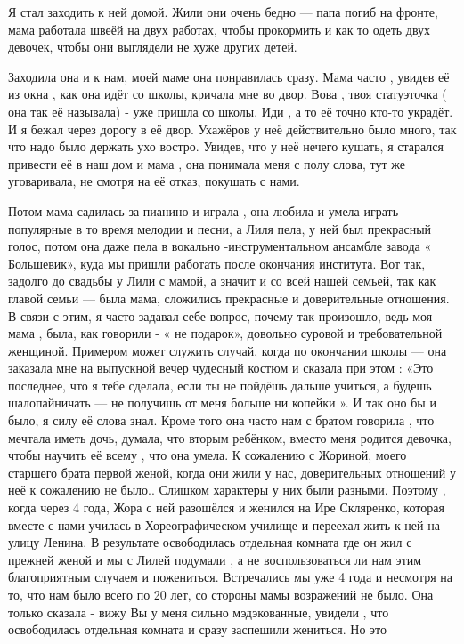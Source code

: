 Я стал заходить к ней домой. Жили они очень бедно — папа погиб на фронте, мама
работала швеёй на двух работах, чтобы прокормить и как то одеть двух девочек,
чтобы они  выглядели не хуже других детей.

Заходила она и к нам, моей маме она понравилась сразу. Мама часто , увидев её
из окна , как она идёт со школы, кричала мне во двор. Вова , твоя статуэточка (
она так её называла) - уже пришла со школы. Иди , а то её точно кто-то украдёт.
И я бежал через дорогу в её двор.  Ухажёров у неё действительно было много, так
что надо было держать ухо востро. Увидев, что у неё нечего  кушать, я старался
привести её в наш дом и мама , она понимала меня с полу слова, тут же
уговаривала, не смотря на её отказ, покушать с нами.

Потом мама садилась за пианино и играла , она любила и умела играть популярные
в то время мелодии и песни, а Лиля пела, у ней был прекрасный голос, потом она
даже пела в вокально -инструментальном ансамбле завода « Большевик», куда мы
пришли работать после окончания института. Вот так, задолго до свадьбы у Лили с
мамой, а значит и со всей нашей семьей, так как главой семьи — была мама,
сложились прекрасные и доверительные отношения.  В связи с этим, я часто
задавал  себе вопрос, почему так произошло, ведь моя мама ,  была, как говорили
- « не подарок»,  довольно суровой и требовательной женщиной. Примером может
служить случай, когда по окончании школы — она заказала мне на выпускной  вечер
чудесный костюм и сказала при этом : «Это последнее, что я тебе сделала, если
ты не пойдёшь дальше учиться, а будешь шалопайничать — не получишь от меня
больше ни копейки ». И так оно бы и было, я силу её слова знал.  Кроме того она
часто нам с братом говорила , что мечтала иметь дочь, думала, что вторым
ребёнком, вместо меня родится девочка, чтобы научить её всему , что она умела.
К сожалению с Жориной, моего старшего брата первой женой, когда они жили у нас,
доверительных отношений  у неё к сожалению не было.. Слишком характеры у них
были разными. Поэтому , когда через 4 года, Жора с ней разошёлся и женился на
Ире Скляренко, которая  вместе с нами  училась в Хореографическом училище и
переехал  жить к ней на улицу Ленина. В результате  освободилась отдельная
комната где он жил с прежней женой и  мы  с Лилей  подумали , а не
воспользоваться ли нам этим благоприятным случаем  и  пожениться.  Встречались
мы уже 4 года и  несмотря на то, что нам было всего по  20 лет, со стороны мамы
возражений не было. Она только сказала - вижу Вы у меня сильно мэдэкованные,
увидели , что освободилась отдельная комната и сразу заспешили жениться. Но это

